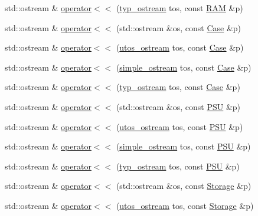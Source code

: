 \begin{DoxyCompactItemize}
\item 
std\+::ostream \& \mbox{\hyperlink{_parts_8cpp_a7ca9eb73748497416cdf556870bb9db5}{operator$<$$<$}} (\mbox{\hyperlink{structtyp__ostream}{typ\+\_\+ostream}} tos, const \mbox{\hyperlink{class_r_a_m}{R\+AM}} \&p)
\item 
std\+::ostream \& \mbox{\hyperlink{_parts_8cpp_a65c2ee003aa5edc6bbaf4c4c18df4166}{operator$<$$<$}} (std\+::ostream \&os, const \mbox{\hyperlink{class_case}{Case}} \&p)
\item 
std\+::ostream \& \mbox{\hyperlink{_parts_8cpp_a77cdcd9f79b67b63f1b1e12759d2bee0}{operator$<$$<$}} (\mbox{\hyperlink{structutos__ostream}{utos\+\_\+ostream}} tos, const \mbox{\hyperlink{class_case}{Case}} \&p)
\item 
std\+::ostream \& \mbox{\hyperlink{_parts_8cpp_aea3efd6d444d917b4efe7ee109e0544f}{operator$<$$<$}} (\mbox{\hyperlink{structsimple__ostream}{simple\+\_\+ostream}} tos, const \mbox{\hyperlink{class_case}{Case}} \&p)
\item 
std\+::ostream \& \mbox{\hyperlink{_parts_8cpp_a5f8685455fc7d29deed2f632d8b84a68}{operator$<$$<$}} (\mbox{\hyperlink{structtyp__ostream}{typ\+\_\+ostream}} tos, const \mbox{\hyperlink{class_case}{Case}} \&p)
\item 
std\+::ostream \& \mbox{\hyperlink{_parts_8cpp_aa5927379449df3d8bbc27e025c5d148f}{operator$<$$<$}} (std\+::ostream \&os, const \mbox{\hyperlink{class_p_s_u}{P\+SU}} \&p)
\item 
std\+::ostream \& \mbox{\hyperlink{_parts_8cpp_a4ba52014f911426a8b686e368603f396}{operator$<$$<$}} (\mbox{\hyperlink{structutos__ostream}{utos\+\_\+ostream}} tos, const \mbox{\hyperlink{class_p_s_u}{P\+SU}} \&p)
\item 
std\+::ostream \& \mbox{\hyperlink{_parts_8cpp_aa42ec563064084ecc9346b4261853fa6}{operator$<$$<$}} (\mbox{\hyperlink{structsimple__ostream}{simple\+\_\+ostream}} tos, const \mbox{\hyperlink{class_p_s_u}{P\+SU}} \&p)
\item 
std\+::ostream \& \mbox{\hyperlink{_parts_8cpp_a0706c93f76ce74588a6d3ba64e4d6dd1}{operator$<$$<$}} (\mbox{\hyperlink{structtyp__ostream}{typ\+\_\+ostream}} tos, const \mbox{\hyperlink{class_p_s_u}{P\+SU}} \&p)
\item 
std\+::ostream \& \mbox{\hyperlink{_parts_8cpp_a83138f021cbea0af0a56c70cdb1e0454}{operator$<$$<$}} (std\+::ostream \&os, const \mbox{\hyperlink{class_storage}{Storage}} \&p)
\item 
std\+::ostream \& \mbox{\hyperlink{_parts_8cpp_a0d1b0d887a5d979d6059c644bbf6801b}{operator$<$$<$}} (\mbox{\hyperlink{structutos__ostream}{utos\+\_\+ostream}} tos, const \mbox{\hyperlink{class_storage}{Storage}} \&p)

\end{DoxyCompactItemize}
